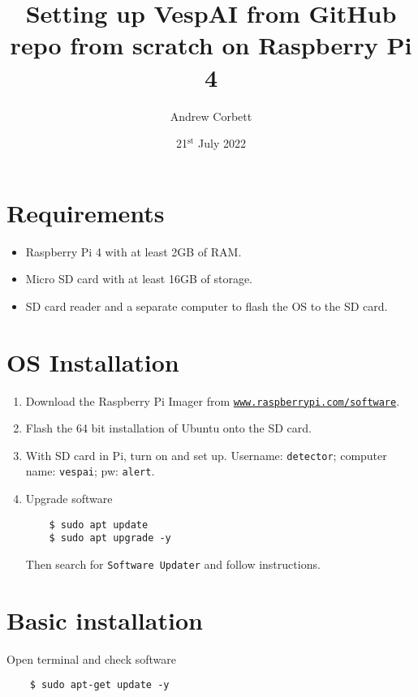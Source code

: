 \documentclass[12pt, a4paper, oneside]{article}
\title{Setting up VespAI from GitHub repo from scratch on Raspberry Pi 4}
\author{Andrew Corbett}
\date{21$^{\mathrm{st}}$ July 2022}
\begin{document}
\maketitle

\section{Requirements}

\begin{itemize}
\item
Raspberry Pi 4 with at least 2GB of RAM.

\item
Micro SD card with at least 16GB of storage.

\item
SD card reader and a separate computer to flash the OS to the SD card.
\end{itemize}


\section{OS Installation}

\begin{enumerate}

\item
Download the Raspberry Pi Imager from \href{https://www.raspberrypi.com/software/}{\texttt{www.raspberrypi.com/software}}.

\item
Flash the 64 bit installation of Ubuntu onto the SD card.

\item
With SD card in Pi, turn on and set up. Username: \texttt{detector}; computer name: \texttt{vespai}; pw: \texttt{alert}.

\item
Upgrade software
\begin{verbatim}
	$ sudo apt update
	$ sudo apt upgrade -y
\end{verbatim}
Then search for \texttt{Software Updater} and follow instructions.

\end{enumerate}


\section{Basic installation}
Open terminal and check software
\begin{verbatim}
	$ sudo apt-get update -y
\end{verbatim}
\end{document}
